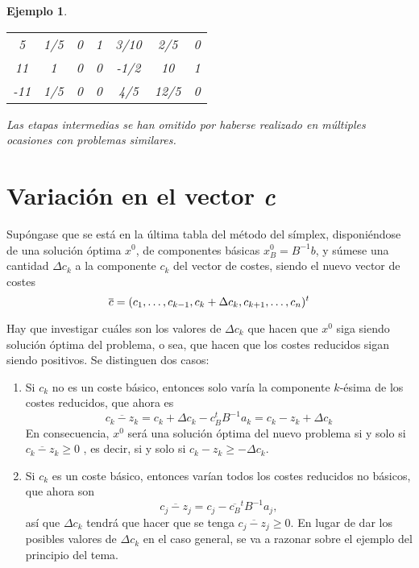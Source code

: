 \documentclass[11pt]{report}
\theoremstyle{mytheorem}
\theoremstyle{mydefinition}
\theoremstyle{myexample}
\newtheorem*{example}{Ejemplo}
\begin{document}
\begin{example}
\begin{center}
\begin{tabular}{|c|c|c|c|c|c|c|}
    \phantom{-}5 & \multicolumn{1}{c}{1/5} & \multicolumn{1}{c}{\phantom{-}0} & \multicolumn{1}{c}{\phantom{-}1} & \multicolumn{1}{c}{\phantom{-}3/10}& \multicolumn{1}{c}{2/5} & \multicolumn{1}{c|}{0}  \\
    
    \phantom{-}11 & \multicolumn{1}{c}{1} & \multicolumn{1}{c}{\phantom{-}0} & \multicolumn{1}{c}{\phantom{-}0} & \multicolumn{1}{c}{-1/2}& \multicolumn{1}{c}{10} & \multicolumn{1}{c|}{1} \\ \cline{1-7}
    
    -11 & \multicolumn{1}{c}{1/5} & \multicolumn{1}{c}{\phantom{-}0} & \multicolumn{1}{c}{\phantom{-}0} & \multicolumn{1}{c}{\phantom{-}4/5} & \multicolumn{1}{c}{12/5} & \multicolumn{1}{c|}{0} \\ \cline{1-7}
\end{tabular}
\end{center}
Las etapas intermedias se han omitido por haberse realizado en múltiples ocasiones con problemas similares.
\end{example}

\section{Variación en el vector \textit{c}}

Supóngase que se está en la última tabla del método del símplex, disponiéndose de una solución óptima $x^0$, de componentes básicas $x^0_B = B^{-1}b$, y súmese una cantidad $\Delta c_k$ a la componente $c_k$ del vector de costes, siendo el nuevo vector de costes 
\[\overline{c} = (c_1,\mathellipsis,c_{k-1},c_k+\Delta c_k,c_{k+1},\mathellipsis,c_n)^t\]

Hay que investigar cuáles son los valores de $\Delta c_k$ que hacen que $x^0$ siga siendo solución óptima del problema, o sea, que hacen que los costes reducidos sigan siendo positivos. Se distinguen dos casos:

\begin{enumerate}
    \item Si $c_k$ no es un coste básico, entonces solo varía la componente $k$-ésima de los costes reducidos, que ahora es
    \[\overline{c_k-z_k} = c_k+\Delta c_k - c_B^tB^{-1}a_k = c_k-z_k+\Delta c_k\]
    En consecuencia, $x^0$ será una solución óptima del nuevo problema si y solo si $\overline{c_k-z_k} \geq 0$ , es decir, si y solo si $ c_k-z_k\geq -\Delta c_k$.
    \item Si $c_k$ es un coste básico, entonces varían todos los costes reducidos no básicos, que ahora son
    \[\overline{c_j-z_j} = c_j-\overline{c_B}^tB^{-1}a_j,\]
    así que $\Delta c_k$ tendrá que hacer que se tenga $\overline{c_j-z_j} \geq 0$. En lugar de dar los posibles valores de $\Delta c_k$ en el caso general, se va a razonar sobre el ejemplo del principio del tema.
\end{enumerate}
\end{document}
